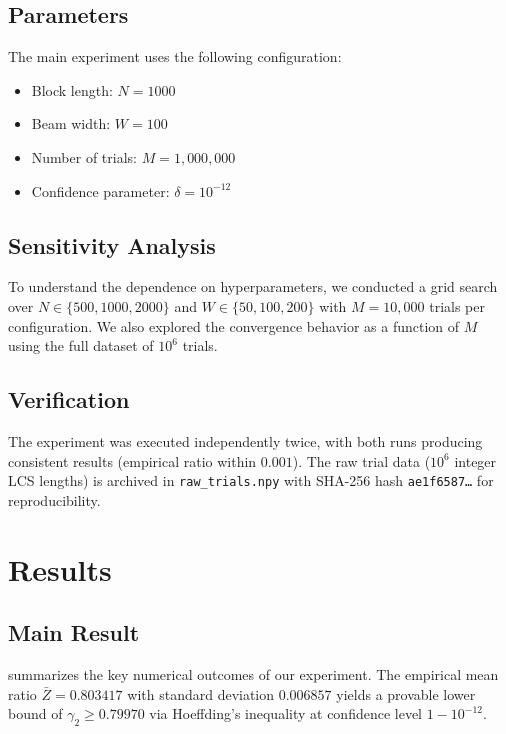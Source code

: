 \documentclass[11pt,a4paper]{article}
\theoremstyle{definition}
\begin{document}
\subsection{Parameters}

The main experiment uses the following configuration:
\begin{itemize}
  \item Block length: $N = 1000$
  \item Beam width: $W = 100$
  \item Number of trials: $M = 1{,}000{,}000$
  \item Confidence parameter: $\delta = 10^{-12}$
\end{itemize}

\subsection{Sensitivity Analysis}

To understand the dependence on hyperparameters, we conducted a grid search
over $N \in \{500, 1000, 2000\}$ and $W \in \{50, 100, 200\}$ with $M =
10{,}000$ trials per configuration. We also explored the convergence behavior
as a function of $M$ using the full dataset of $10^6$ trials.

\subsection{Verification}

The experiment was executed independently twice, with both runs producing
consistent results (empirical ratio within $0.001$). The raw trial data ($10^6$
integer LCS lengths) is archived in \texttt{raw\_trials.npy} with SHA-256 hash
\texttt{ae1f6587\ldots} for reproducibility.

\section{Results}
\label{sec:results}

\subsection{Main Result}

 summarizes the key numerical outcomes of our experiment.
The empirical mean ratio $\bar{Z} = 0.803417$ with standard deviation $0.006857$
yields a provable lower bound of $\gamma_2 \geq 0.79970$ via Hoeffding's
inequality at confidence level $1 - 10^{-12}$.
\end{document}
